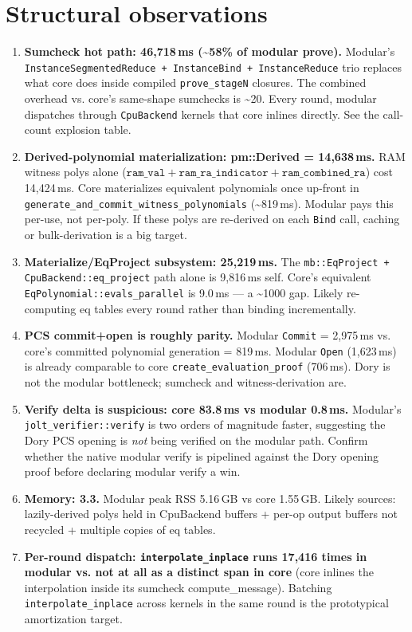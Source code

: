 \documentclass[10pt,a4paper]{article}
\begin{document}
\section{Structural observations}
\begin{enumerate}
\item \textbf{Sumcheck hot path: 46,718\,ms (\textasciitilde58\% of modular prove).} Modular's \texttt{InstanceSegmentedReduce + InstanceBind + InstanceReduce} trio replaces what core does inside compiled \texttt{prove\_stageN} closures. The combined overhead vs. core's same-shape sumchecks is \textasciitilde 20\texttimes{}. Every round, modular dispatches through \texttt{CpuBackend} kernels that core inlines directly. See the call-count explosion table.
\item \textbf{Derived-polynomial materialization: pm::Derived = 14,638\,ms.} RAM witness polys alone ($\texttt{ram\_val} + \texttt{ram\_ra\_indicator} + \texttt{ram\_combined\_ra}$) cost 14,424\,ms. Core materializes equivalent polynomials once up-front in \texttt{generate\_and\_commit\_witness\_polynomials} (\textasciitilde 819\,ms). Modular pays this per-use, not per-poly. If these polys are re-derived on each \texttt{Bind} call, caching or bulk-derivation is a big target.
\item \textbf{Materialize/EqProject subsystem: 25,219\,ms.} The \texttt{mb::EqProject + CpuBackend::eq\_project} path alone is 9,816\,ms self. Core's equivalent \texttt{EqPolynomial::evals\_parallel} is 9.0\,ms --- a \textasciitilde 1000\texttimes{} gap. Likely re-computing eq tables every round rather than binding incrementally.
\item \textbf{PCS commit+open is roughly parity.} Modular \texttt{Commit} = 2,975\,ms vs. core's committed polynomial generation = 819\,ms. Modular \texttt{Open} (1,623\,ms) is already comparable to core \texttt{create\_evaluation\_proof} (706\,ms). Dory is not the modular bottleneck; sumcheck and witness-derivation are.
\item \textbf{Verify delta is suspicious: core 83.8\,ms vs modular 0.8\,ms.} Modular's \texttt{jolt\_verifier::verify} is two orders of magnitude faster, suggesting the Dory PCS opening is \emph{not} being verified on the modular path. Confirm whether the native modular verify is pipelined against the Dory opening proof before declaring modular verify a win.
\item \textbf{Memory: 3.3\texttimes.} Modular peak RSS 5.16\,GB vs core 1.55\,GB. Likely sources: lazily-derived polys held in CpuBackend buffers + per-op output buffers not recycled + multiple copies of eq tables.
\item \textbf{Per-round dispatch: \texttt{interpolate\_inplace} runs 17,416 times in modular vs. not at all as a distinct span in core} (core inlines the interpolation inside its sumcheck compute\_message). Batching \texttt{interpolate\_inplace} across kernels in the same round is the prototypical amortization target.
\end{enumerate}
\end{document}
